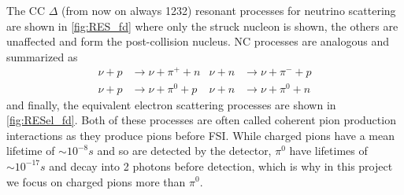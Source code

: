 \documentclass[a4paper,12pt]{article}
\begin{document}
The CC $\Delta$ (from now on always 1232) resonant processes for neutrino scattering are shown in \cref{fig:RES_fd} where only the struck nucleon is shown, the others are unaffected and form the post-collision nucleus.
NC processes are analogous and summarized as
\begin{align}
    \nu + p &\rightarrow \nu + \pi^+ + n & \nu + n &\rightarrow \nu + \pi^- + p \\
    \nu + p &\rightarrow \nu + \pi^0 + p & \nu + n &\rightarrow \nu + \pi^0 + n
\end{align}
and finally, the equivalent electron scattering processes are shown in \cref{fig:RESel_fd}.
Both of these processes are often called coherent pion production interactions as they produce pions before FSI.
While charged pions have a mean lifetime of $\sim 10^{-8} \si{s}$ and so are detected by the detector, $\pi^0$ have lifetimes of $\sim 10^{-17} \si{s}$ \cite{particledatagroupReviewParticlePhysics2022} and decay into 2 photons before detection, which is why in this project we focus on charged pions more than $\pi^0$.
\end{document}
